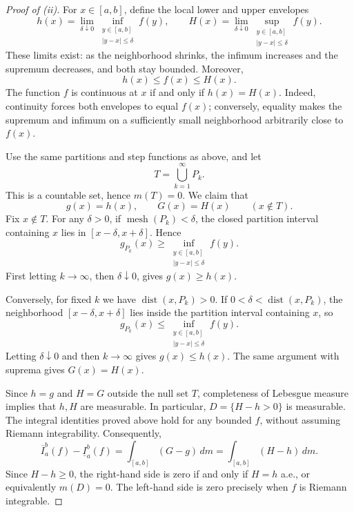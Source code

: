 \begin{proof}[Proof of (ii)]
  For $x\in[a,b]$, define the local lower and upper envelopes
  \[
    h(x)=\lim_{\delta\downarrow0}
      \inf_{\substack{y\in[a,b]\\|y-x|\leq\delta}}f(y),\qquad
    H(x)=\lim_{\delta\downarrow0}
      \sup_{\substack{y\in[a,b]\\|y-x|\leq\delta}}f(y).
  \]
  These limits exist: as the neighborhood shrinks, the infimum
  increases and the supremum decreases, and both stay bounded.
  Moreover,
  \[
    h(x)\leq f(x)\leq H(x).
  \]
  The function $f$ is continuous at $x$ if and only if
  $h(x)=H(x)$. Indeed, continuity forces both envelopes to equal
  $f(x)$; conversely, equality makes the supremum and infimum on a
  sufficiently small neighborhood arbitrarily close to $f(x)$.

  Use the same partitions and step functions as above, and let
  \[
    T=\bigcup_{k=1}^{\infty}P_k.
  \]
  This is a countable set, hence $m(T)=0$. We claim that
  \[
    g(x)=h(x),\qquad G(x)=H(x)\qquad(x\notin T).
  \]
  Fix $x\notin T$. For any $\delta>0$, if
  $\operatorname{mesh}(P_k)<\delta$, the closed partition interval
  containing $x$ lies in $[x-\delta,x+\delta]$. Hence
  \[
    g_{P_k}(x)\geq
      \inf_{\substack{y\in[a,b]\\|y-x|\leq\delta}}f(y).
  \]
  First letting $k\to\infty$, then $\delta\downarrow0$, gives
  $g(x)\geq h(x)$.

  Conversely, for fixed $k$ we have
  $\operatorname{dist}(x,P_k)>0$. If
  $0<\delta<\operatorname{dist}(x,P_k)$, the neighborhood
  $[x-\delta,x+\delta]$ lies inside the partition interval containing
  $x$, so
  \[
    g_{P_k}(x)\leq
      \inf_{\substack{y\in[a,b]\\|y-x|\leq\delta}}f(y).
  \]
  Letting $\delta\downarrow0$ and then $k\to\infty$ gives
  $g(x)\leq h(x)$. The same argument with suprema gives $G(x)=H(x)$.

  Since $h=g$ and $H=G$ outside the null set $T$, completeness of
  Lebesgue measure implies that $h,H$ are measurable. In particular,
  $D=\{H-h>0\}$ is measurable. The integral identities proved above
  hold for any bounded $f$, without assuming Riemann integrability.
  Consequently,
  \[
    \overline I_a^b(f)-\underline I_a^b(f)
      =\int_{[a,b]}(G-g)\,dm=\int_{[a,b]}(H-h)\,dm.
  \]
  Since $H-h\geq0$, the right-hand side is zero if and only if
  $H=h$ a.e., or equivalently $m(D)=0$. The left-hand side is zero
  precisely when $f$ is Riemann integrable.
\end{proof}

